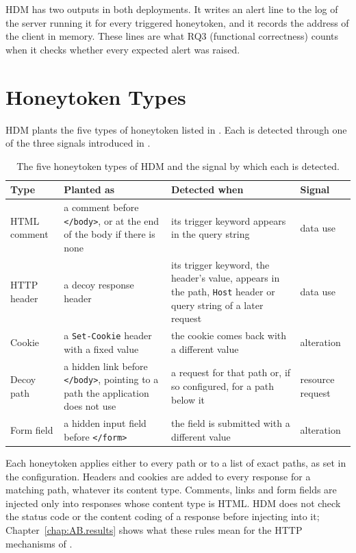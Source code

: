 \documentclass{rptuma}
\begin{document}
HDM has two outputs in both deployments. It writes an alert line to the log of the server running it for every triggered
honeytoken, and it records the address of the client in memory. These lines are what RQ3 (functional correctness) counts when it checks whether every expected alert was raised.

\section{Honeytoken Types}
\label{sec:design.types}

HDM plants the five types of honeytoken listed in . Each is detected
through one of the three signals introduced in .

\begin{table}[htbp]
\centering
\small
\begin{tabularx}{\textwidth}{@{}l*{3}{>{\raggedright\arraybackslash}X}@{}}
\toprule
Type & Planted as & Detected when & Signal \\
\midrule
HTML comment & a comment before \texttt{</body>}, or at the end of the body if there is none
  & its trigger keyword appears in the query string & data use \\
HTTP header & a decoy response header
  & its trigger keyword, the header's value, appears in the path, \texttt{Host} header or query
    string of a later request
  & data use \\
Cookie & a \texttt{Set-Cookie} header with a fixed value
  & the cookie comes back with a different value & alteration \\
Decoy path & a hidden link before \texttt{</body>}, pointing to a path the application does not use
  & a request for that path or, if so configured, for a path below it & resource request \\
Form field & a hidden input field before \texttt{</form>}
  & the field is submitted with a different value & alteration \\
\bottomrule
\end{tabularx}
\caption{The five honeytoken types of HDM and the signal by which each is detected.}
\label{tab:design.types}
\end{table}

Each honeytoken applies either to every path or to a list of exact paths, as set in the
configuration. Headers and cookies are added to every response for a matching path, whatever its
content type. Comments, links and form fields are injected only into responses whose content type
is HTML. HDM does not check the status code or the content coding of a response before injecting
into it; Chapter~\ref{chap:AB.results}
shows what these rules mean for the HTTP mechanisms of .
\end{document}
